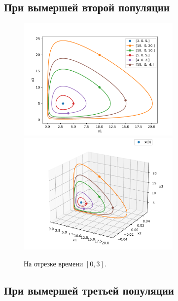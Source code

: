     \subsection{При вымершей второй популяции}

    \begin{figure}[H]
        \includegraphics[width=8cm]{pictures/x2_0phase.pdf}
        \includegraphics[width=8cm]{pictures/x2_0phase3.pdf}
        \caption{На отрезке времени \( [0, 3] \).}
    \end{figure}


    \subsection{При вымершей третьей популяции}

